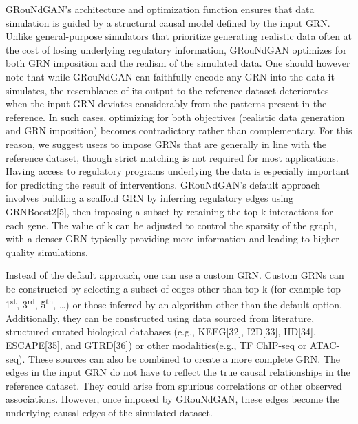 GRouNdGAN’s architecture and optimization function ensures that data simulation is guided by
a structural causal model defined by the input GRN. Unlike general-purpose simulators that
prioritize generating realistic data often at the cost of losing underlying regulatory information,
GRouNdGAN optimizes for both GRN imposition and the realism of the simulated data. One
should however note that while GRouNdGAN can faithfully encode any GRN into the data it
simulates, the resemblance of its output to the reference dataset deteriorates when the input
GRN deviates considerably from the patterns present in the reference. In such cases, optimizing
for both objectives (realistic data generation and GRN imposition) becomes contradictory rather
than complementary. For this reason, we suggest users to impose GRNs that are generally in line
with the reference dataset, though strict matching is not required for most applications. Having
access to regulatory programs underlying the data is especially important for predicting the result
of interventions. GRouNdGAN’s default approach involves building a scaffold GRN by inferring
regulatory edges using GRNBoost2[5], then imposing a subset by retaining the top k interactions
for each gene. The value of k can be adjusted to control the sparsity of the graph, with a denser
GRN typically providing more information and leading to higher-quality simulations. 

Instead of the default approach, one can use a custom GRN. Custom GRNs can be constructed by
selecting a subset of edges other than top k (for example top 1\textsuperscript{st}, 3\textsuperscript{rd}, 5\textsuperscript{th}, …) or those inferred by
an algorithm other than the default option. Additionally, they can be constructed using data
sourced from literature, structured curated biological databases (e.g., KEEG[32], I2D[33], IID[34],
ESCAPE[35], and GTRD[36]) or other modalities(e.g., TF ChIP-seq or ATAC-seq). These sources can also be combined to create a more complete GRN. The edges in the input GRN do not have to
reflect the true causal relationships in the reference dataset. They could arise from spurious
correlations or other observed associations. However, once imposed by GRouNdGAN, these
edges become the underlying causal edges of the simulated dataset.

